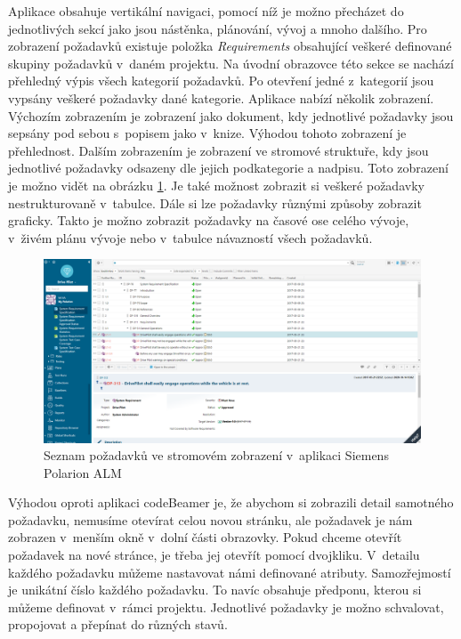\documentclass[czech,master]{diploma}
\begin{document}
Aplikace obsahuje vertikální navigaci, pomocí níž je možno přecházet do jednotlivých sekcí jako jsou nástěnka, plánování, vývoj a mnoho dalšího. Pro zobrazení požadavků existuje položka \textit{Requirements} obsahující veškeré definované skupiny požadavků v~daném projektu. Na úvodní obrazovce této sekce se nachází přehledný výpis všech kategorií požadavků. Po otevření jedné z~kategorií jsou vypsány veškeré požadavky dané kategorie. Aplikace nabízí několik zobrazení. Výchozím zobrazením je zobrazení jako dokument, kdy jednotlivé požadavky jsou sepsány pod sebou s~popisem jako v~knize. Výhodou tohoto zobrazení je přehlednost. Dalším zobrazením je zobrazení ve stromové struktuře, kdy jsou jednotlivé požadavky odsazeny dle jejich podkategorie a nadpisu. Toto zobrazení je možno vidět na obrázku \ref{fig:polarion_requirements}. Je také možnost zobrazit si veškeré požadavky nestrukturovaně v~tabulce. Dále si lze požadavky různými způsoby zobrazit graficky. Takto je možno zobrazit požadavky na časové ose celého vývoje, v~živém plánu vývoje nebo v~tabulce návazností všech požadavků.

\begin{figure}[!ht]
    \centering
    \includegraphics[width=1\textwidth]{Diplomka/Figures/polarion_requirements.png}
    \caption{Seznam požadavků ve stromovém zobrazení v~aplikaci Siemens Polarion ALM}
    \label{fig:polarion_requirements}
\end{figure}

Výhodou oproti aplikaci codeBeamer je, že abychom si zobrazili detail samotného požadavku, nemusíme otevírat celou novou stránku, ale požadavek je nám zobrazen v~menším okně v~dolní části obrazovky. Pokud chceme otevřít požadavek na nové stránce, je třeba jej otevřít pomocí dvojkliku. V~detailu každého požadavku můžeme nastavovat námi definované atributy. Samozřejmostí je unikátní číslo každého požadavku. To navíc obsahuje předponu, kterou si můžeme definovat v~rámci projektu. Jednotlivé požadavky je možno schvalovat, propojovat a přepínat do různých stavů.
\end{document}
